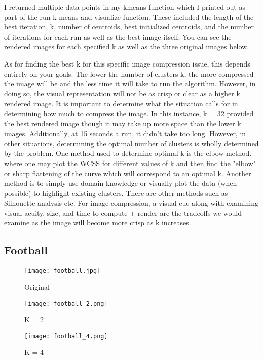 \documentclass{article}
\begin{document}
I returned multiple data points in my kmeans function which I printed out as part of the run-k-means-and-visualize
function. These included the length of the best iteration, k, number of centroids, best initialized centroids,
and the number of iterations for each run as well as the best image itself. You can see the rendered images
for each specified k as well as the three original images below.

As for finding the best k for this specific image compression issue, this depends entirely on your goals. The lower
the number of clusters k, the more compressed the image will be and the less time it will take to run the algorithm.
However, in doing so, the visual representation will not be as crisp or clear as a higher k rendered image. It is
important to determine what the situation calls for in determining how much to compress the image. In this instance,
k = 32 provided the best rendered image though it may take up more space than the lower k images. Additionally,
at 15 seconds a run, it didn't take too long. However, in other situations, determining the optimal number of clusters
is wholly determined by the problem. One method used to determine optimal k is the elbow method. where one may
plot the WCSS for different values of k and then find the "elbow" or sharp flattening of the curve which will
correspond to an optimal k. Another method is to simply use domain knowledge or visually plot the data (when possible)
to highlight existing clusters. There are other methods such as Silhouette analysis etc. For image compression,
a visual cue along with examining visual acuity, size, and time to compute + render are the
tradeoffs we would examine as the image will become more crisp as k increases.


\subsection*{Football}

\begin{figure}[H]
    \centering
    \texttt{[image: football.jpg]}
    \caption{Original}
\end{figure}

\begin{figure}[H]
    \centering
    \texttt{[image: football\_2.png]}
    \caption{K = 2}
\end{figure}

\begin{figure}[H]
    \centering
    \texttt{[image: football\_4.png]}
    \caption{K = 4}
\end{figure}
\end{document}
